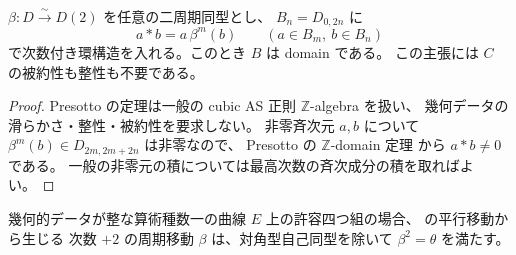 \begin{proposition}
\label{prop:all-quadric-even-domain}
$\beta:D\xrightarrow\sim D(2)$ を任意の二周期同型とし、
$B_n=D_{0,2n}$ に
\[
 a*b=a\,\beta^m(b)\qquad(a\in B_m,\ b\in B_n)
\]
で次数付き環構造を入れる。このとき $B$ は domain である。
この主張には $C$ の被約性も整性も不要である。
\end{proposition}

\begin{proof}
Presotto の定理は一般の cubic AS 正則 $\mathbb Z$-algebra を扱い、
幾何データの滑らかさ・整性・被約性を要求しない。
非零斉次元 $a,b$ について $\beta^m(b)\in D_{2m,2m+2n}$ は非零なので、
Presotto の $\mathbb Z$-domain 定理\cite[Theorem 2.8; Appendix A]{Presotto2018}
から $a*b\ne0$ である。
一般の非零元の積については最高次数の斉次成分の積を取ればよい。
\end{proof}

\begin{lemma}[整な楕円四つ組の二周期の平方]
\label{lem:elliptic-period-square}
幾何的データが整な算術種数一の曲線 $E$ 上の許容四つ組の場合、
\cite[arXiv v3, Proposition 5.6.1]{VdB2011} の平行移動から生じる
次数 $+2$ の周期移動 $\beta$ は、対角型自己同型を除いて
$\beta^2=\theta$ を満たす。
\end{lemma}

